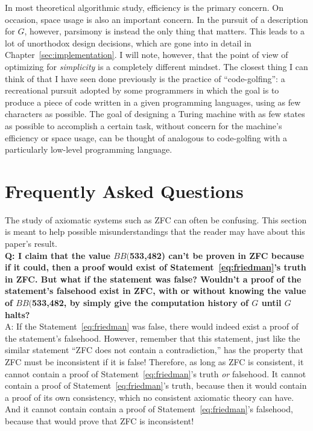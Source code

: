 \documentclass{report}
\newcommand{\bbstatenum}{$BB($533,482) }
\newcommand{\bbstatenumcomma}{$BB($533,482, }
\begin{document}
In most theoretical algorithmic study, efficiency is the primary concern. On occasion, space usage is also an important concern. In the pursuit of a description for $G$, however, parsimony is instead the only thing that matters. This leads to a lot of unorthodox design decisions, which are gone into in detail in Chapter~\ref{sec:implementation}. I will note, however, that the point of view of optimizing for \emph{simplicity} is a completely different mindset. The closest thing I can think of that I have seen done previously is the practice of ``code-golfing'': a recreational pursuit adopted by some programmers in which the goal is to produce a piece of code written in a given programming languages, using as few characters as possible. The goal of designing a Turing machine with as few states as possible to accomplish a certain task, without concern for the machine's efficiency or space usage, can be thought of analogous to code-golfing with a particularly low-level programming language.

\section{Frequently Asked Questions \label{sec:faq}}

The study of axiomatic systems such as ZFC can often be confusing. This section is meant to help possible misunderstandings that the reader may have about this paper's result. \\

\textbf{Q: I claim that the value \bbstatenum can't be proven in ZFC because if it could, then a proof would exist of Statement~\ref{eq:friedman}'s truth in ZFC. But what if the statement was false? Wouldn't a proof of the statement's falsehood exist in ZFC, with or without knowing the value of \bbstatenumcomma by simply give the computation history of $G$ until $G$ halts?} \\

A: If the Statement~\ref{eq:friedman} was false, there would indeed exist a proof of the statement's falsehood. However, remember that this statement, just like the similar statement ``ZFC does not contain a contradiction,'' has the property that ZFC must be inconsistent if it is false! Therefore, as long as ZFC is consistent, it cannot contain a proof of Statement~\ref{eq:friedman}'s truth \emph{or} falsehood. It cannot contain a proof of Statement~\ref{eq:friedman}'s truth, because then it would contain a proof of its own consistency, which no consistent axiomatic theory can have. And it cannot contain contain a proof of Statement~\ref{eq:friedman}'s falsehood, because that would prove that ZFC is inconsistent! \\
\end{document}
